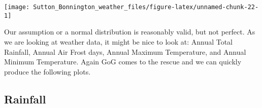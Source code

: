 \documentclass{article}
\begin{document}
\begin{center}\texttt{[image: Sutton\_Bonnington\_weather\_files/figure-latex/unnamed-chunk-22-1]} \end{center}

Our assumption or a normal distribution is reasonably valid, but not perfect. As we are looking at weather data, it might be nice to look at: Annual Total Rainfall, Annual Air Frost days, Annual Maximum Temperature, and Annual Minimum Temperature. Again GoG comes to the rescue and we can quickly produce the following plots.

\hypertarget{rainfall}{%
\subsection{Rainfall}\label{rainfall}}
\end{document}
